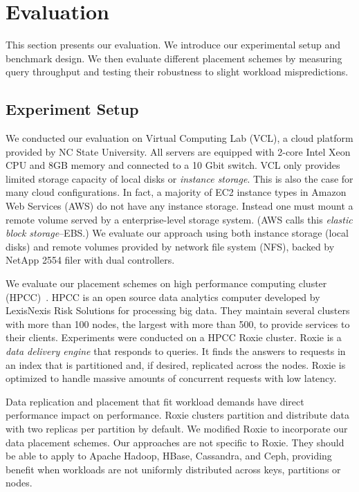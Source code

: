 \section{Evaluation}
\label{sec:evaluation}

This section presents our evaluation.
We introduce our experimental setup and benchmark
design.
We then evaluate different placement schemes
by measuring query throughput and
testing their robustness to slight workload mispredictions.


\subsection{Experiment Setup}

We conducted our evaluation on Virtual Computing Lab (VCL), a cloud
platform provided by NC State University.
All servers are equipped with 2-core Intel Xeon CPU and 8GB memory
and connected to a 10 Gbit switch. 
VCL only provides limited storage capacity of local disks or
\emph{instance storage}.
This is also the case for many cloud configurations.
In fact, a majority of EC2 instance types in Amazon Web Services (AWS) do not
have any instance storage.
Instead one must mount a remote volume served by a enterprise-level
storage system.
(AWS calls this \emph{elastic block storage}--EBS.)
We evaluate our approach using both instance storage (local disks) and
remote volumes provided by network file system (NFS),
backed by NetApp 2554 filer with dual controllers.

We evaluate our placement schemes on
high performance computing cluster (HPCC)~\cite{middleton2011hpcc}.
HPCC is an open source
data analytics computer developed by LexisNexis Risk
Solutions for processing big data.
They maintain several clusters with more than 100 nodes, the largest
with more than 500, to provide services to their clients.
Experiments were conducted on a HPCC Roxie cluster.
Roxie is a \emph{data delivery engine} that responds to queries.
It finds the answers to requests in an index that is partitioned and,
if desired, replicated across the nodes.
Roxie is optimized to handle massive amounts of concurrent requests
with low latency.

Data replication and placement that fit workload demands
have direct performance impact on performance.
Roxie clusters partition and distribute data
with two replicas per partition by default.
We modified Roxie to incorporate our data placement schemes.
Our approaches are not specific to Roxie.
They should be able to apply to
Apache Hadoop, HBase, Cassandra, and Ceph, providing benefit when
workloads are not uniformly distributed across
keys, partitions or nodes.


